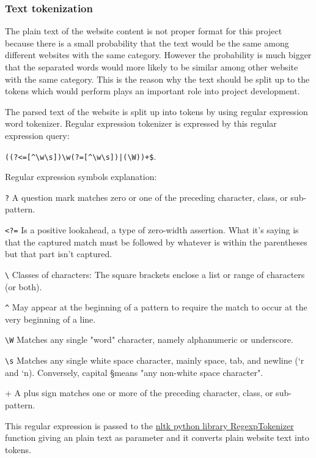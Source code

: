 \subsubsection{Text tokenization}

The plain text of the website content is not proper format for this project because there is a small probability that the text would be the same among different websites with the same category. However the probability is much bigger that the separated words would more likely to be similar among other website with the same category. This is the reason why the text should be split up to the tokens which would perform plays an important role into project development. 

The parsed text of the website is split up into tokens by using regular expression word tokenizer. Regular expression tokenizer is expressed by this regular expression query: 


\verb/((?<=[^\w\s])\w(?=[^\w\s])|(\W))+$/.

Regular expression symbols explanation:
\begin{description}
    \item \verb/?/ A question mark matches zero or one of the preceding character, class, or sub-pattern. 
    \item \verb/<?=/ Is a positive lookahead, a type of zero-width assertion. What it's saying is that the captured match must be followed by whatever is within the parentheses but that part isn't captured.
    \item \verb/\/ Classes of characters: The square brackets enclose a list or range of characters (or both).
    \item \verb/^/ May appear at the beginning of a pattern to require the match to occur at the very beginning of a line.
    \item \verb/\W/ Matches any single "word" character, namely alphanumeric or underscore.
    \item \verb/\s/ Matches any single white space character, mainly space, tab, and newline (`r and `n). Conversely, capital \S means "any non-white space character". 
    \item + A plus sign matches one or more of the preceding character, class, or sub-pattern.
\end{description}
This regular expression is passed to the \href{https://www.nltk.org/_modules/nltk/tokenize/regexp.html}{nltk python library RegexpTokenizer} function giving an plain text as parameter and it converts plain website text into tokens.

